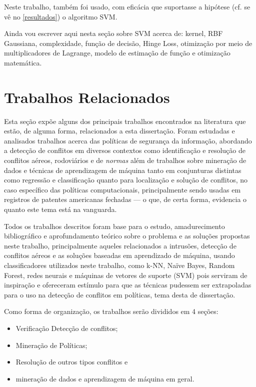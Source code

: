 Neste trabalho, também foi usado, com eficácia que suportasse a hipótese (cf. se vê no \autoref{resultados}) o algoritmo SVM.

Ainda vou escrever aqui nesta seção sobre SVM acerca de: kernel, RBF Gaussiana, complexidade, função de decisão, Hinge Loss, otimização por meio de multiplicadores de Lagrange, modelo de estimação de função e otimização matemática.

\section{Trabalhos Relacionados}\label{trabalhos_relacionados}
Esta seção expõe alguns dos principais trabalhos encontrados na literatura que estão, de alguma forma, relacionados a esta dissertação. Foram estudadas e analisados trabalhos acerca das políticas de segurança da informação, abordando a detecção de conflitos em diversos contextos como identificação e resolução de conflitos aéreos, rodoviários e de \textit{normas} além de trabalhos sobre mineração de dados e técnicas de aprendizagem de máquina tanto em conjunturas distintas como regressão e classificação quanto para localização e solução de conflitos, no caso específico das políticas computacionais, principalmente sendo usadas em registros de patentes americanas fechadas --- o que, de certa forma, evidencia o quanto este tema está na vanguarda.

Todos os trabalhos descritos foram base para o estudo, amadurecimento bibliográfico e aprofundamento teórico sobre o problema e as soluções propostas neste trabalho, principalmente aqueles relacionados a intrusões, detecção de conflitos aéreos e as soluções baseadas em aprendizado de máquina, usando classificadores utilizados neste trabalho, como k-NN, Naïve Bayes, Random Forest, redes neurais e máquinas de vetores de suporte (SVM) pois serviram de inspiração e ofereceram estímulo para que as técnicas pudessem ser extrapoladas para o uso na detecção de conflitos em políticas, tema desta de dissertação. 

Como forma de organização, os trabalhos serão divididos em 4 seções:\begin{itemize}
	\item Verificação Detecção de conflitos;
	\item Mineração de Políticas;
	\item Resolução de outros tipos conflitos e 
	\item mineração de dados e aprendizagem de máquina em geral.
\end{itemize}

